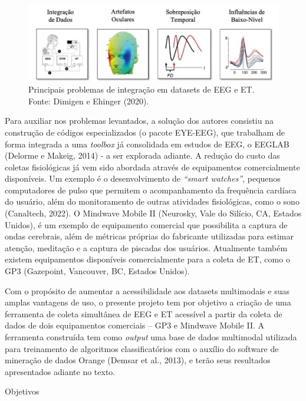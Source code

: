 \documentclass[a4paper, 12pt]{ppgeb}
\makeatletter
\renewcommand{\section}{\@startsection
{section}
{1}
{0mm}
{-\baselineskip}
{0.5\baselineskip}
{\large\bfseries\scshape}}
\makeatother
\begin{document}
\begin{figure}[h]
    \centering
    \includegraphics[width=130mm]{problemas_eeget.jpg}
    \caption[Exemplo de um acelerador linear utilizado no Hospital Universitário de Brasília.]
    {Principais problemas de integração em datasets de EEG e ET. Fonte: Dimigen e
    Ehinger (2020).}\label{fig:acelerador}
    \end{figure}

Para auxiliar nos problemas levantados, a solução dos autores consistiu na construção de códigos especializados (o pacote EYE-EEG),
que trabalham de forma integrada a uma \textit{toolbox} já consolidada em estudos de EEG, o EEGLAB (Delorme e Makeig, 2014) - a ser explorada adiante. A redução do custo das coletas fisiológicas já vem sido abordada através de equipamentos comercialmente disponíveis. 
Um exemplo é o desenvolvimento de \textit{“smart watches”}, pequenos computadores de pulso que permitem o acompanhamento da
frequência cardíaca do usuário, além do monitoramento de outras atividades fisiológicas, como o sono (Canaltech, 2022).
O Mindwave Mobile II (Neurosky, Vale do Silício, CA, Estados Unidos), é um exemplo de equipamento comercial que possibilita a captura de ondas cerebrais, além de métricas 
próprias do fabricante utilizadas para estimar atenção, meditação e a captura de piscadas dos usuários. Atualmente também 
existem equipamentos disponíveis comercialmente para a coleta de ET, como o GP3 (Gazepoint, Vancouver, BC, Estados Unidos). 


Com o propósito de aumentar a acessibilidade aos datasets multimodais e suas amplas vantagens de uso, 
o presente projeto tem por objetivo a criação de uma ferramenta de coleta simultânea de EEG e ET acessível a 
partir da coleta de dados de dois equipamentos comerciais – GP3 e Mindwave Mobile II. A ferramenta construída tem como \textit{output} uma base de dados multimodal
 utilizada para treinamento de algoritmos classificatórios com o auxílio do software de mineração de dados Orange (Demsar et al., 2013), e terão seus resultados apresentados
 adiante no texto.


\section{Objetivos}
\end{document}
